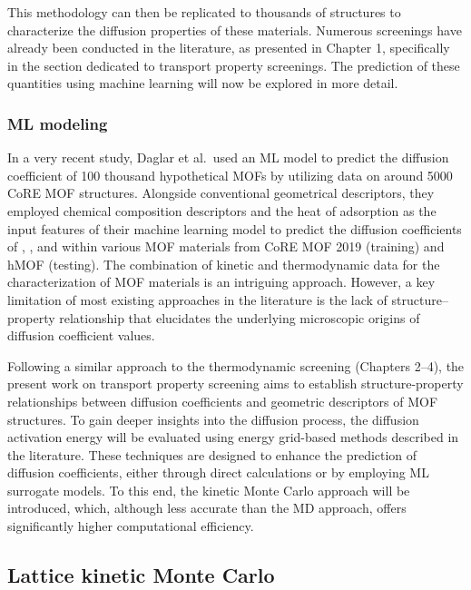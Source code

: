 \documentclass[main]{subfiles}
\begin{document}
This methodology can then be replicated to thousands of structures to characterize the diffusion properties of these materials. Numerous screenings have already been conducted in the literature, as presented in Chapter 1, specifically in the section dedicated to transport property screenings. The prediction of these quantities using machine learning will now be explored in more detail.

\subsubsection{ML modeling}

In a very recent study, Daglar et al.\ used an ML model to predict the diffusion coefficient of 100 thousand hypothetical MOFs by utilizing data on around 5000 CoRE MOF structures.\autocite{Daglar_2022} Alongside conventional geometrical descriptors, they employed chemical composition descriptors and the heat of adsorption as the input features of their machine learning model to predict the diffusion coefficients of , ,  and  within various MOF materials from CoRE MOF 2019 (training) and hMOF (testing). The combination of kinetic and thermodynamic data for the characterization of MOF materials is an intriguing approach. However, a key limitation of most existing approaches in the literature is the lack of structure--property relationship that elucidates the underlying microscopic origins of diffusion coefficient values.

Following a similar approach to the thermodynamic screening (Chapters 2--4), the present work on transport property screening aims to establish structure-property relationships between diffusion coefficients and geometric descriptors of MOF structures. To gain deeper insights into the diffusion process, the diffusion activation energy will be evaluated using energy grid-based methods described in the literature. These techniques are designed to enhance the prediction of diffusion coefficients, either through direct calculations or by employing ML surrogate models. To this end, the kinetic Monte Carlo approach will be introduced, which, although less accurate than the MD approach, offers significantly higher computational efficiency.

\subsection{Lattice kinetic Monte Carlo}
\end{document}
